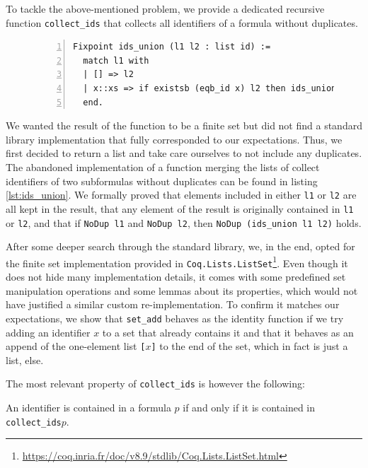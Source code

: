 To tackle the above-mentioned problem, we provide a dedicated recursive function \texttt{collect\_ids} that collects all identifiers of a formula without duplicates.

\begin{figure}[t]
    \begin{lstlisting}[language=coq,numbers=left,numberstyle=\tiny,label=lst:ids_union,caption=Custom duplicate free list merging function.]
Fixpoint ids_union (l1 l2 : list id) :=
  match l1 with
  | [] => l2
  | x::xs => if existsb (eqb_id x) l2 then ids_union xs l2 else ids_union xs (x :: l2)
  end.
\end{lstlisting}
\end{figure}

We wanted the result of the function to be a finite set but did not find a standard library implementation that fully corresponded to our expectations.
Thus, we first decided to return a list and take care ourselves to not include any duplicates.
The abandoned implementation of a function merging the lists of collect identifiers of two subformulas without duplicates can be found in listing \ref{lst:ids_union}.
We formally proved that elements included in either \texttt{l1} or \texttt{l2} are all kept in the result, that any element of the result is originally contained in \texttt{l1} or \texttt{l2}, and that if \texttt{NoDup l1} and \texttt{NoDup l2}, then \texttt{NoDup (ids\_union l1 l2)} holds.

After some deeper search through the standard library, we, in the end, opted for the finite set implementation provided in \texttt{Coq.Lists.ListSet}\footnote{\url{https://coq.inria.fr/doc/v8.9/stdlib/Coq.Lists.ListSet.html}}.
Even though it does not hide many implementation details, it comes with some predefined set manipulation operations and some lemmas about its properties, which would not have justified a similar custom re-implementation.
To confirm it matches our expectations, we show that \texttt{set\_add} behaves as the identity function if we try adding an identifier $x$ to a set that already contains it and that it behaves as an append of the one-element list \texttt{[$x$]} to the end of the set, which in fact is just a list, else.

The most relevant property of \texttt{collect\_ids} is however the following:
\begin{lemma}
    An identifier is contained in a formula $p$ if and only if it is contained in \texttt{collect\_ids\;$p$}.
\end{lemma}

